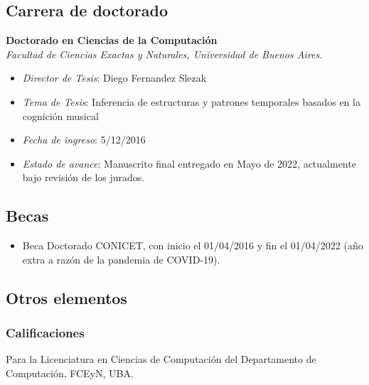 \documentclass[a4paper,10pt]{article}
\begin{document}
\subsection{Carrera de doctorado}

\textbf{Doctorado en Ciencias de la Computación}\\
\indent{}\emph{Facultad de Ciencias Exactas y Naturales, Universidad de Buenos Aires.}
\begin{itemize}
    \item \emph{Director de Tesis}: Diego Fernandez Slezak
    \item \emph{Tema de Tesis}: Inferencia de estructuras y patrones temporales
        basados en la cognición musical
    \item \emph{Fecha de ingreso}: 5/12/2016
    \item \emph{Estado de avance}: Manuscrito final entregado en Mayo de 2022,
      actualmente bajo revisión de los jurados.
\end{itemize}

\subsection{Becas}

\begin{itemize}
    \item Beca Doctorado CONICET, con inicio el 01/04/2016 y fin el 01/04/2022
      (año extra a razón de la pandemia de COVID-19).
\end{itemize}

\subsection{Otros elementos}

\subsubsection{Calificaciones}

Para la Licenciatura en Ciencias de Computación del Departamento de
Computación, FCEyN, UBA.
\end{document}
